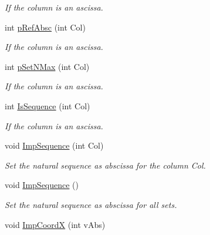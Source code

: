 \begin{DoxyCompactItemize}
\begin{DoxyCompactList}\small\item\em \-If the column is an ascissa. \end{DoxyCompactList}\item 
\hypertarget{classVarDatFile_a79be07c83bc49d7f5e55c64944ed6304}{int \hyperlink{classVarDatFile_a79be07c83bc49d7f5e55c64944ed6304}{p\-Ref\-Absc} (int \-Col)}\label{classVarDatFile_a79be07c83bc49d7f5e55c64944ed6304}

\begin{DoxyCompactList}\small\item\em \-If the column is an ascissa. \end{DoxyCompactList}\item 
\hypertarget{classVarDatFile_a0b6ccc25f21f2a83096da6af6ea943e3}{int \hyperlink{classVarDatFile_a0b6ccc25f21f2a83096da6af6ea943e3}{p\-Set\-N\-Max} (int \-Col)}\label{classVarDatFile_a0b6ccc25f21f2a83096da6af6ea943e3}

\begin{DoxyCompactList}\small\item\em \-If the column is an ascissa. \end{DoxyCompactList}\item 
\hypertarget{classVarDatFile_a5c788a95c78a3da32eaac2f2f994de58}{int \hyperlink{classVarDatFile_a5c788a95c78a3da32eaac2f2f994de58}{\-Is\-Sequence} (int \-Col)}\label{classVarDatFile_a5c788a95c78a3da32eaac2f2f994de58}

\begin{DoxyCompactList}\small\item\em \-If the column is an ascissa. \end{DoxyCompactList}\item 
\hypertarget{classVarDatFile_a00eaf560508e46c0949042ab38af99de}{void \hyperlink{classVarDatFile_a00eaf560508e46c0949042ab38af99de}{\-Imp\-Sequence} (int \-Col)}\label{classVarDatFile_a00eaf560508e46c0949042ab38af99de}

\begin{DoxyCompactList}\small\item\em \-Set the natural sequence as abscissa for the column \-Col. \end{DoxyCompactList}\item 
\hypertarget{classVarDatFile_ad0ccdbdedaf66f5c01e3b850148a6b00}{void \hyperlink{classVarDatFile_ad0ccdbdedaf66f5c01e3b850148a6b00}{\-Imp\-Sequence} ()}\label{classVarDatFile_ad0ccdbdedaf66f5c01e3b850148a6b00}

\begin{DoxyCompactList}\small\item\em \-Set the natural sequence as abscissa for all sets. \end{DoxyCompactList}\item 
\hypertarget{classVarDatFile_a963c1d12c9e593a16748f229bc5bd11f}{void \hyperlink{classVarDatFile_a963c1d12c9e593a16748f229bc5bd11f}{\-Imp\-Coord\-X} (int v\-Abs)}\label{classVarDatFile_a963c1d12c9e593a16748f229bc5bd11f}


\end{DoxyCompactItemize}

